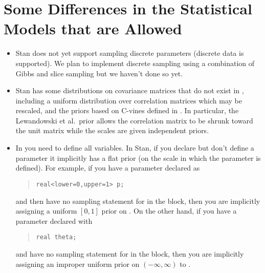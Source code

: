 \section{Some Differences in the Statistical Models that are Allowed}

\begin{itemize}
\item Stan does not yet support sampling discrete parameters (discrete
  data is supported).  We plan to implement discrete sampling using a
  combination of Gibbs and slice sampling but we haven't done so yet.
\item Stan has some distributions on covariance matrices that do not
  exist in \BUGS, including a uniform distribution over correlation
  matrices which may be rescaled, and the priors based on C-vines
  defined in \citep{LewandowskiKurowickaJoe:2009}.  In particular, the
  Lewandowski et al.\ prior allows the correlation matrix to be shrunk
  toward the unit matrix while the scales are given independent priors.
\item In \BUGS you need to define all variables.  In Stan, if you
  declare but don't define a parameter it implicitly has a flat prior
  (on the scale in which the parameter is defined).  For example, if
  you have a parameter  declared as 
\begin{quote}
\begin{Verbatim}
real<lower=0,upper=1> p;
\end{Verbatim}
\end{quote}
%
and then have no sampling statement for  in the 
block, then you are implicitly assigning a uniform $[0,1]$ prior on
.
On the other hand, if you have a parameter  declared with
%
\begin{quote}
\begin{Verbatim}
real theta;
\end{Verbatim}
\end{quote}
%
and have no sampling statement for  in the
 block, 
 then you are implicitly assigning an improper uniform prior
on $(-\infty,\infty)$ to .  
%

\end{itemize}
